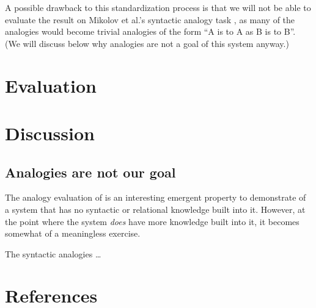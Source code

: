 \documentclass[letterpaper]{article}
\begin{document}
A possible drawback to this standardization process is that we will not be able
to evaluate the result on Mikolov et al.'s syntactic analogy task
\cite{mikolov2013word2vec}, as many of the analogies would become trivial
analogies of the form ``A is to A as B is to B''. (We will discuss below
why analogies are not a goal of this system anyway.)

\section{Evaluation}



\section{Discussion}

\subsection{Analogies are not our goal}
\label{analogies-meh}

The analogy evaluation of \cite{mikolov2013word2vec} is an interesting
emergent property to demonstrate of a system that has no syntactic or
relational knowledge built into it. However, at the point where the system
{\em does} have more knowledge built into it, it becomes somewhat of
a meaningless exercise.

The syntactic analogies \ldots

\section{References}

\end{document}
